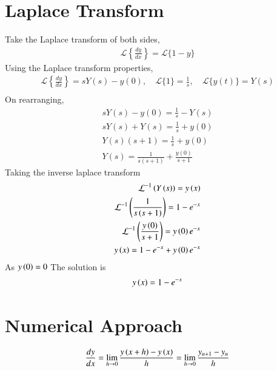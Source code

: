 \documentclass[journal,12pt,onecolumn]{IEEEtran}
\theoremstyle{remark}
\begin{document}
\section{Laplace Transform}
Take the Laplace transform of both sides,\\
\begin{align*}
    \mathcal{L}\left\{\frac{dy}{dx}\right\} = \mathcal{L}\{1 - y\}
\end{align*}
Using the Laplace transform properties,\\
\begin{align*}
    \mathcal{L}\left\{\frac{dy}{dx}\right\} = sY(s) - y(0), \quad \mathcal{L}\{1\} = \frac{1}{s}, \quad \mathcal{L}\{y(t)\} = Y(s)\\
\end{align*}
On rearranging,\\
\begin{align*}
    sY(s) - y(0) = \frac{1}{s} - Y(s)\\
    sY(s) + Y(s) = \frac{1}{s} + y(0)\\
    Y(s)(s + 1) = \frac{1}{s} + y(0)\\
    Y(s) = \frac{1}{s(s+1)} + \frac{y(0)}{s+1}
\end{align*}
Taking the inverse laplace transform \\
\begin{align*}
\mathcal{L}^{-1}\left(Y\left(s\right)\right)=y\left(x\right)\\
    \mathcal{L}^{-1}\left(\frac{1}{s\left(s+1\right)}\right)=1-e^{-x}\\
    \mathcal{L}^{-1}\left(\frac{y\left(0\right)}{s+1}\right)=y\left(0\right)e^{-x}\\
    y\left(x\right)=1-e^{-x}+y\left(0\right)e^{-x}\\
\end{align*}
As $y\left(0\right)=0$
The solution is 
\begin{align*}
    y\left(x\right)=1-e^{-x}
\end{align*}
\section{Numerical Approach}
\begin{align*}
\frac{dy}{dx}=\lim_{h \rightarrow 0} \frac{y\left(x+h\right)-y\left(x\right)}{h}
=\lim_{h \rightarrow 0}\frac{{}y_{n+1}-y_{n}}{h}
\end{align*}
\end{document}
